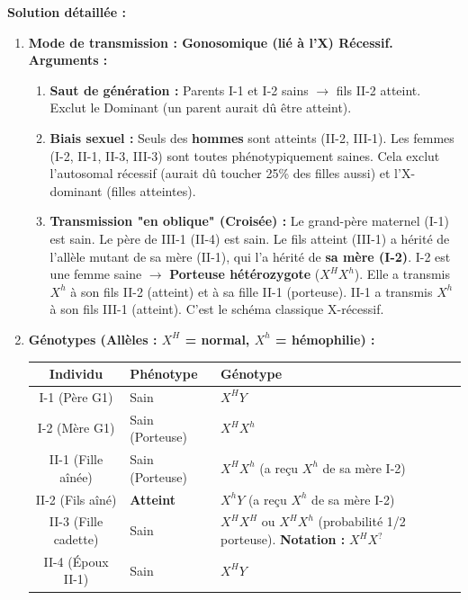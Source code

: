 \documentclass[11pt]{article}
\begin{document}
\begin{exoresolu}
    \tcblower
    \textbf{Solution détaillée :}
    \begin{enumerate}
        \item \textbf{Mode de transmission : \textbf{Gonosomique (lié à l'X) Récessif}.}
            \textbf{Arguments :}
            \begin{enumerate}
                \item \textbf{Saut de génération :} Parents I-1 et I-2 sains $\rightarrow$ fils II-2 atteint. Exclut le Dominant (un parent aurait dû être atteint).
                \item \textbf{Biais sexuel :} Seuls des \textbf{hommes} sont atteints (II-2, III-1). Les femmes (I-2, II-1, II-3, III-3) sont toutes phénotypiquement saines. Cela exclut l'autosomal récessif (aurait dû toucher 25\% des filles aussi) et l'X-dominant (filles atteintes).
                \item \textbf{Transmission "en oblique" (Croisée) :} Le grand-père maternel (I-1) est sain. Le père de III-1 (II-4) est sain. Le fils atteint (III-1) a hérité de l'allèle mutant de sa mère (II-1), qui l'a hérité de \textbf{sa mère (I-2)}. I-2 est une femme saine $\rightarrow$ \textbf{Porteuse hétérozygote} ($X^H X^h$). Elle a transmis $X^h$ à son fils II-2 (atteint) et à sa fille II-1 (porteuse). II-1 a transmis $X^h$ à son fils III-1 (atteint). C'est le schéma classique X-récessif.
            \end{enumerate}
        \item \textbf{Génotypes (Allèles : $X^H$ = normal, $X^h$ = hémophilie) :}
            \begin{center}
            \begin{tabular}{|c|l|l|}\hline
            \rowcolor{popblueL}
            \textbf{Individu} & \textbf{Phénotype} & \textbf{Génotype} \\ \hline
            I-1 (Père G1) & Sain & $X^H Y$ \\ \hline
            I-2 (Mère G1) & Sain (Porteuse) & $X^H X^h$ \\ \hline
            II-1 (Fille aînée) & Sain (Porteuse) & $X^H X^h$ (a reçu $X^h$ de sa mère I-2) \\ \hline
            II-2 (Fils aîné) & \textbf{Atteint} & $X^h Y$ (a reçu $X^h$ de sa mère I-2) \\ \hline
            II-3 (Fille cadette) & Sain & $X^H X^H$ ou $X^H X^h$ (probabilité 1/2 porteuse). \textbf{Notation :} $X^H X^{?}$ \\ \hline
            II-4 (Époux II-1) & Sain & $X^H Y$ \\ \hline

\end{tabular}
\end{center}
\end{enumerate}
\end{exoresolu}
\end{document}

